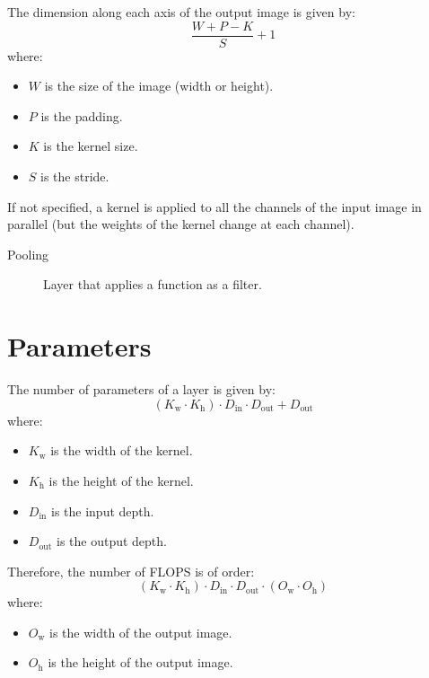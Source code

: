 \begin{description}
        The dimension along each axis of the output image is given by:
        \[ \frac{W + P - K}{S} + 1 \]
        where:
        \begin{itemize}
            \item $W$ is the size of the image (width or height).
            \item $P$ is the padding.
            \item $K$ is the kernel size.
            \item $S$ is the stride.
        \end{itemize}

        \begin{remark}
            If not specified, a kernel is applied to all the channels of the input image in parallel (but the weights of the kernel change at each channel).
        \end{remark}
\end{description}


\begin{description}
    \item[Pooling]
        Layer that applies a function as a filter.

\end{description}


\section{Parameters}

The number of parameters of a layer is given by:
\[ (K_\text{w} \cdot K_\text{h}) \cdot D_\text{in} \cdot D_\text{out} + D_\text{out} \]
where:
\begin{itemize}
    \item $K_\text{w}$ is the width of the kernel.
    \item $K_\text{h}$ is the height of the kernel.
    \item $D_\text{in}$ is the input depth.
    \item $D_\text{out}$ is the output depth.
\end{itemize}

Therefore, the number of FLOPS is of order:
\[ (K_\text{w} \cdot K_\text{h}) \cdot D_\text{in} \cdot D_\text{out} \cdot (O_\text{w} \cdot O_\text{h}) \]
where:
\begin{itemize}
    \item $O_\text{w}$ is the width of the output image.
    \item $O_\text{h}$ is the height of the output image.
\end{itemize}